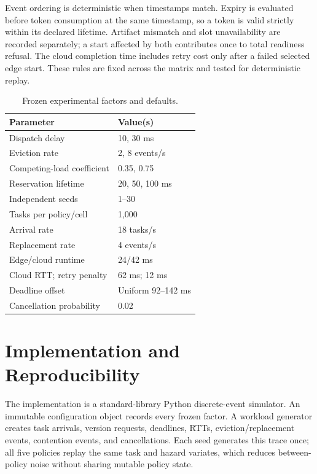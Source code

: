\documentclass[conference]{IEEEtran}
\begin{document}
Event ordering is deterministic when timestamps match. Expiry is evaluated before
token consumption at the same timestamp, so a token is valid strictly within its
declared lifetime. Artifact mismatch and slot unavailability are recorded
separately; a start affected by both contributes once to total readiness refusal.
The cloud completion time includes retry cost only after a failed selected edge
start. These rules are fixed across the matrix and tested for deterministic replay.

\begin{table}[t]
\centering
\caption{Frozen experimental factors and defaults.}
\label{tab:config}
\footnotesize
\begin{tabular}{ll}
\toprule
Parameter & Value(s) \\
\midrule
Dispatch delay & 10, 30 ms \\
Eviction rate & 2, 8 events/s \\
Competing-load coefficient & 0.35, 0.75 \\
Reservation lifetime & 20, 50, 100 ms \\
Independent seeds & 1--30 \\
Tasks per policy/cell & 1,000 \\
Arrival rate & 18 tasks/s \\
Replacement rate & 4 events/s \\
Edge/cloud runtime & 24/42 ms \\
Cloud RTT; retry penalty & 62 ms; 12 ms \\
Deadline offset & Uniform 92--142 ms \\
Cancellation probability & 0.02 \\
\bottomrule
\end{tabular}
\end{table}

\section{Implementation and Reproducibility}

The implementation is a standard-library Python discrete-event simulator. An
immutable configuration object records every frozen factor. A workload generator
creates task arrivals, version requests, deadlines, RTTs, eviction/replacement
events, contention events, and cancellations. Each seed generates this trace once;
all five policies replay the same task and hazard variates, which reduces
between-policy noise without sharing mutable policy state.
\end{document}
